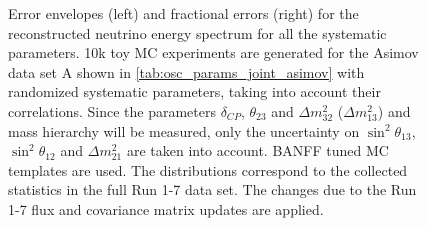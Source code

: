 \begin{figure}[htb]
\caption {
Error envelopes (left) and fractional errors (right) for the reconstructed neutrino energy spectrum
for all the systematic parameters.
10k toy MC experiments are generated for the Asimov data set A shown in \cref{tab:osc_params_joint_asimov}
with randomized systematic parameters, taking into account their correlations.
Since the parameters $\delta_{CP}$, $\theta_{23}$ and $\Delta m^2_{32}$ ($\Delta m^2_{13}$) and mass hierarchy
will be measured,
only the uncertainty on 
$\sin^2 \theta_{13}$,
$\sin^2 \theta_{12}$
and 
$\Delta m^2_{21}$ 
are taken into account.
BANFF tuned MC templates are used. 
The distributions correspond to the collected statistics in the full Run 1-7 data set.
The changes due to the Run 1-7 flux and covariance matrix updates are applied.
}
\label{fig:spectra_systematic_Asimov_A_run17}
\end{figure}





